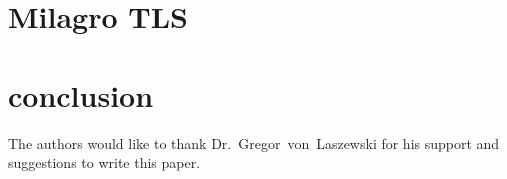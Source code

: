 \section{Milagro TLS}

\section{conclusion}


\begin{acks}

  The authors would like to thank Dr.~Gregor~von~Laszewski for his
  support and suggestions to write this paper.

\end{acks}




 
